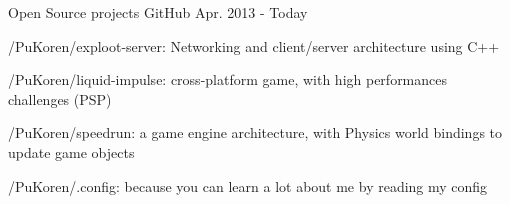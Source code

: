 

\begin{cventries}

  \cventry
    {} %
    {Open Source projects} %
    {GitHub} %
    {Apr. 2013 - Today} %
    {
      \begin{cvitems} %
        \item {/PuKoren/exploot-server: Networking and client/server architecture using C++}
        \item {/PuKoren/liquid-impulse: cross-platform game, with high performances challenges (PSP)}
        \item {/PuKoren/speedrun: a game engine architecture, with Physics world bindings to update game objects}
        \item {/PuKoren/.config: because you can learn a lot about me by reading my config}
      \end{cvitems}
    }


\end{cventries}
